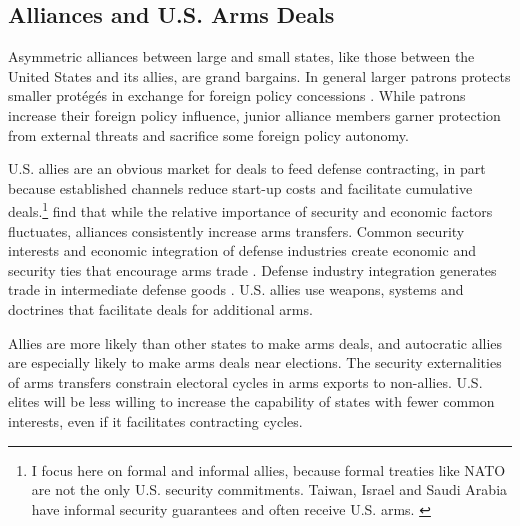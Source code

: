 \documentclass[12pt]{article}
\begin{document}
\subsection{Alliances and U.S. Arms Deals}


Asymmetric alliances between large and small states, like those between the United States and its allies, are grand bargains.
In general larger patrons protects smaller prot{\'e}g{\'e}s in exchange for foreign policy concessions \citep{Morrow1991}.
While patrons increase their foreign policy influence, junior alliance members garner protection from external threats and sacrifice some foreign policy autonomy.




U.S. allies are an obvious market for deals to feed defense contracting, in part because established channels reduce start-up costs and facilitate cumulative deals.\footnote{I focus here on formal and informal allies, because formal treaties like NATO are not the only U.S. security commitments. Taiwan, Israel and Saudi Arabia have informal security guarantees and often receive U.S. arms. \citep{Yarhi-Miloetal2016}}
\citet{Thurneretal2019} find that while the relative importance of security and economic factors fluctuates, alliances consistently increase arms transfers.
Common security interests and economic integration of defense industries create economic and security ties that encourage arms trade \citep{Bitzinger1994}. 
Defense industry integration generates trade in intermediate defense goods \citep{Brooks2005}. 
U.S. allies use weapons, systems and doctrines that facilitate deals for additional arms. 


Allies are more likely than other states to make arms deals, and autocratic allies are especially likely to make arms deals near elections. 
The security externalities of arms transfers constrain electoral cycles in arms exports to non-allies. 
U.S. elites will be less willing to increase the capability of states with fewer common interests, even if it facilitates contracting cycles.
\end{document}
